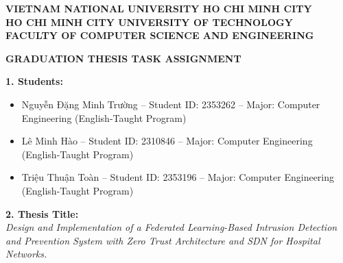 
\noindent\textbf{VIETNAM NATIONAL UNIVERSITY HO CHI MINH CITY}\\
\textbf{HO CHI MINH CITY UNIVERSITY OF TECHNOLOGY}\\
\textbf{FACULTY OF COMPUTER SCIENCE AND ENGINEERING}

\vspace{0.5cm}
\begin{center}
  {\Large\bfseries GRADUATION THESIS TASK ASSIGNMENT}
\end{center}
\vspace{0.4cm}

\noindent\textbf{1. Students:}
\begin{itemize}[leftmargin=1.8em, nosep]
  \item Nguyễn Đặng Minh Trường -- Student ID: 2353262 -- Major: Computer Engineering (English-Taught Program)
  \item Lê Minh Hào -- Student ID: 2310846 -- Major: Computer Engineering (English-Taught Program)
  \item Triệu Thuận Toàn -- Student ID: 2353196 -- Major: Computer Engineering (English-Taught Program)
\end{itemize}

\vspace{0.3cm}
\noindent\textbf{2. Thesis Title:}\\
\textit{Design and Implementation of a Federated Learning-Based Intrusion Detection and Prevention System with Zero Trust Architecture and SDN for Hospital Networks.}

